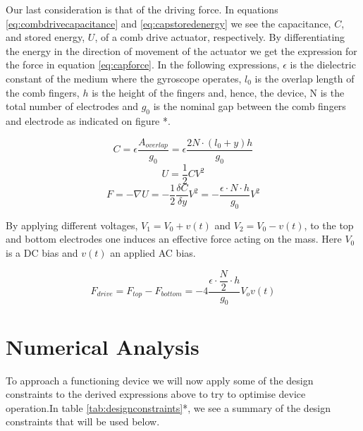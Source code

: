 \documentclass[12pt,a4paper,titlepage]{article}
\begin{document}
\begin{spacing}{1.1}
Our last consideration is that of the driving force. In equations \ref{eq:combdrivecapacitance} and \ref{eq:capstoredenergy} we see the capacitance, $C$, and stored energy, $ U $, of a comb drive actuator, respectively. By differentiating the energy in the direction of movement of the actuator we get the expression for the force in equation \ref{eq:capforce}. In the following expressions, $\epsilon$ is the dielectric constant of the medium where the gyroscope operates, $l_0$ is the overlap length of the comb fingers, $h$ is the height of the fingers and, hence, the device, N is the total number of electrodes and $g_0$ is the nominal gap between the comb fingers and electrode as indicated on figure *.

\begin{equation}
C = \epsilon \dfrac{A_{overlap}}{g_0} = \epsilon \dfrac{2N \cdot (l_0 +y) h  }{g_0}
\label{eq:combdrivecapacitance}
\end{equation}
\begin{equation}
U = \dfrac{1}{2} C V^2
\label{eq:capstoredenergy}
\end{equation}
\begin{equation}
F = -\nabla U = - \dfrac{1}{2} \dfrac{\delta C}{\delta y} V^2 = -\dfrac{\epsilon \cdot N  \cdot h}{g_0} V^2
\label{eq:capforce}
\end{equation}

By applying different voltages, $V_1 = V_0 + v(t)$ and $V_2 = V_0 - v(t)$, to the top and bottom electrodes one induces an effective force acting on the mass\supercite{Chang12}. Here $V_0$ is a DC bias and $v(t)$ an applied AC bias.

\begin{equation}
F_{drive} = F_{top} - F_{bottom} = -4\dfrac{\epsilon \cdot \dfrac{N}{2}  \cdot h}{g_0} V_o v(t)
\end{equation} 



\section{Numerical Analysis}
To approach a functioning device we will now apply some of the design constraints to the derived expressions above to try to optimise device operation.In table \ref{tab:designconstraints}*, we see a summary of the design constraints that will be used below.


\end{spacing}
\end{document}
